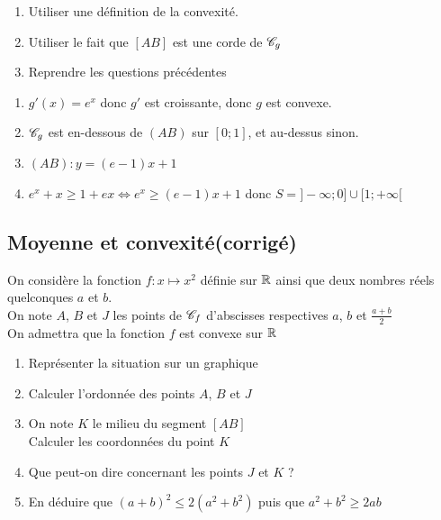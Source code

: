 \documentclass[oneside,12pt]{book}          %
\begin{document}
\begin{hint}
	\begin{enumerate}
		\item Utiliser une définition de la convexité.
		\item Utiliser le fait que $[AB]$ est une corde de ${\mathscr{C}}_g$
		\item[4.] Reprendre les questions précédentes
	\end{enumerate}
\end{hint}
\begin{sol}
	\begin{enumerate}
		\item $g'(x)=e^x$ donc $g'$ est croissante, donc $g$ est convexe.
		\item ${\mathscr{C}}_g$ est en-dessous de $(AB)$ sur $[0;1]$, et au-dessus sinon.
		\item $(AB):y=(e-1)x+1$
		\item $e^x+x\geq1+ex \Leftrightarrow e^x\geq(e-1)x+1$ donc $S=]-\infty;0]\cup[1;+\infty[$
	\end{enumerate}
\end{sol}



\subsection{Moyenne et convexité\quad\small{(corrigé)}}
On considère la fonction $f:x\mapsto x^2$ définie sur ${\mathbb R}$ ainsi que deux nombres réels quelconques $a$ et $b$. \\
On note $A$, $B$ et $J$ les points de ${\mathscr{C}}_f$ d'abscisses respectives $a$, $b$ et $\frac{a+b}{2}$\\
On admettra que la fonction $f$ est convexe sur ${\mathbb R}$
\begin{enumerate}
    \item Représenter la situation sur un graphique
    \item Calculer l'ordonnée des points $A$, $B$ et $J$
    \item On note $K$ le milieu du segment $[AB]$\\
    Calculer les coordonnées du point $K$
    \item Que peut-on dire concernant les points $J$ et $K$ ?
    \item En déduire que $(a+b)^2\leq2(a^2+b^2)$ puis que $a^2+b^2\geq2ab$
\end{enumerate}
\end{document}
